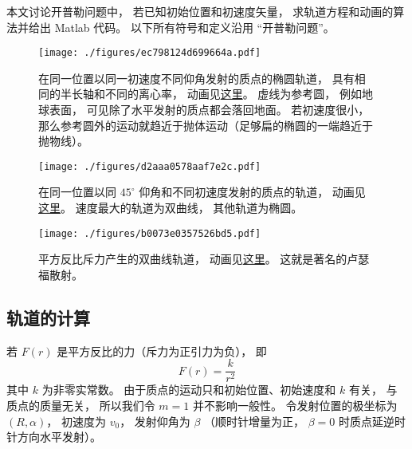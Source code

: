 

本文讨论开普勒问题中， 若已知初始位置和初速度矢量， 求轨道方程和动画的算法并给出 Matlab 代码。 以下所有符号和定义沿用 “开普勒问题”。
\begin{figure}[ht]
\centering
\texttt{[image: ./figures/ec798124d699664a.pdf]}
\caption{在同一位置以同一初速度不同仰角发射的质点的椭圆轨道， 具有相同的半长轴和不同的离心率， 动画见\href{https://wuli.wiki/apps/Kepler.html}{这里}。 虚线为参考圆， 例如地球表面， 可见除了水平发射的质点都会落回地面。 若初速度很小， 那么参考圆外的运动就趋近于抛体运动（足够扁的椭圆的一端趋近于抛物线）。} \label{fig_KepNum_1}
\end{figure}

\begin{figure}[ht]
\centering
\texttt{[image: ./figures/d2aaa0578aaf7e2c.pdf]}
\caption{在同一位置以同 $45^\circ$ 仰角和不同初速度发射的质点的轨道， 动画见\href{https://wuli.wiki/apps/Kepler2.html}{这里}。 速度最大的轨道为双曲线， 其他轨道为椭圆。} \label{fig_KepNum_2}
\end{figure}

\begin{figure}[ht]
\centering
\texttt{[image: ./figures/b0073e0357526bd5.pdf]}
\caption{平方反比斥力产生的双曲线轨道， 动画见\href{https://wuli.wiki/apps/Kepler3.html}{这里}。 这就是著名的卢瑟福散射。} \label{fig_KepNum_3}
\end{figure}


\subsection{轨道的计算}
若 $F(r)$ 是平方反比的力（斥力为正引力为负）， 即
\begin{equation}
F(r) = \frac{k}{r^2}
\end{equation}
其中 $k$ 为非零实常数。 由于质点的运动只和初始位置、初始速度和 $k$ 有关， 与质点的质量无关， 所以我们令 $m=1$ 并不影响一般性。 令发射位置的极坐标为 $(R,\alpha)$， 初速度为 $v_0$， 发射仰角为 $\beta$ （顺时针增量为正， $\beta=0$ 时质点延逆时针方向水平发射）。

